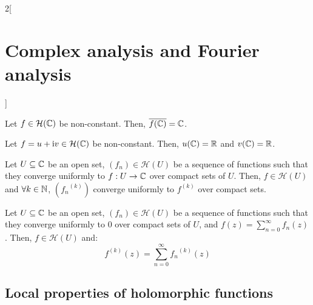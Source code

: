 \documentclass[../../../main.tex]{subfiles}
\begin{document}
\begin{multicols}{2}[\section{Complex analysis and Fourier analysis}]
  \begin{theorem}
    Let $f\in\mathcal{H}(\mathbb{C})$ be non-constant. Then, $\overline{f(\mathbb{C})}=\mathbb{C}$.
  \end{theorem}
  \begin{corollary}
    Let $f=u+\mathrm{i} v\in\mathcal{H}(\mathbb{C})$ be non-constant. Then, $u(\mathbb{C})=\mathbb{R}$ and $v(\mathbb{C})=\mathbb{R}$.
  \end{corollary}
  \begin{theorem}
    Let $U\subseteq\mathbb{C}$ be an open set, $(f_n)\in\mathcal{H}(U)$ be a sequence of functions such that they converge uniformly to $f:U\rightarrow\mathbb{C}$ over compact sets of $U$. Then, $f\in\mathcal{H}(U)$ and $\forall k\in \mathbb{N}$, $({f_n}^{(k)})$ converge uniformly to $f^{(k)}$ over compact sets.
  \end{theorem}
  \begin{corollary}
    Let $U\subseteq\mathbb{C}$ be an open set, $(f_n)\in\mathcal{H}(U)$ be a sequence of functions such that they converge uniformly to 0 over compact sets of $U$, and $f(z)=\sum_{n=0}^\infty f_n(z)$. Then, $f\in\mathcal{H}(U)$ and: $$f^{(k)}(z)=\sum_{n=0}^\infty {f_n}^{(k)}(z)$$
  \end{corollary}
  \subsection{Local properties of holomorphic functions}

\end{multicols}
\end{document}
